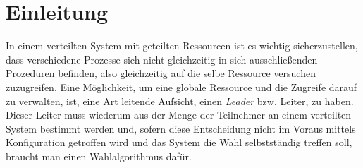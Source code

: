 \section{Einleitung}

In einem verteilten System mit geteilten Ressourcen ist es wichtig sicherzustellen, dass verschiedene Prozesse sich nicht gleichzeitig in sich ausschließenden 
Prozeduren befinden, also gleichzeitig auf die selbe Ressource versuchen zuzugreifen. Eine Möglichkeit, um eine globale Ressource und die Zugreife darauf zu 
verwalten, ist, eine Art leitende Aufsicht, einen \textit{Leader} bzw. Leiter, zu haben. Dieser Leiter muss wiederum aus der Menge der Teilnehmer an einem
verteilten System bestimmt werden und, sofern diese Entscheidung nicht im Voraus mittels Konfiguration getroffen wird und das System die Wahl selbstständig
treffen soll, braucht man einen Wahlalgorithmus dafür.
